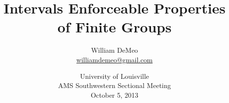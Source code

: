 \RequirePackage{snapshot}
\newcommand{\ConfColor}{darkred}

\newtheorem{prop}[theorem]{Proposition}
\newtheorem{assumption}[theorem]{Assumption}
\theoremstyle{definition}
\newtheorem{question}[theorem]{Question}
\newtheorem{claim}[claim]{Claim}
\newtheorem{conjecture}[conjecture]{Conjecture}
\newtheorem{case}{Case}
\theoremstyle{remark}
\newtheorem*{computations}{Computations}
\newtheorem*{remark}{Remark}
\newtheorem*{remarks}{Remarks}
\newtheorem*{notation}{Notation}
\newtheorem*{exs}{Examples}
\newtheorem*{ex}{Example}

 \newcommand{\IE}{{\small IE}}
 \newcommand{\defn}[1]{\textcolor{\ConfColor}{\textit{\textbf{#1}}}}
\title[IE Properties]{Intervals Enforceable Properties\\of Finite Groups}

\author[William DeMeo]{William DeMeo\\
{\small \url{williamdemeo@gmail.com}}}

\date[]{\vskip1cm
{\color{darkred}University of Louisville}\\[6pt]
{\small AMS Southwestern Sectional Meeting\\[6pt]
October 5, 2013}
}



